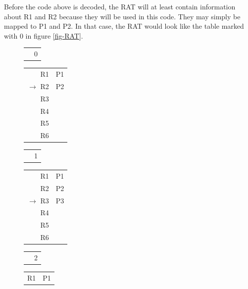 \documentclass[12pt,a4paper]{article} %
\begin{document}
Before the code above is decoded, the RAT will at least contain information about R1 and R2 because they will be used in this code. They may simply be mapped to P1 and P2. In that case, the RAT would look like the table marked with 0 in figure \ref{fig-RAT}.
\begin{figure} [!htb] 
	\hspace{.1\textwidth}%
	\begin{minipage}{.2\textwidth}
		\begin{tabularx} {\textwidth} {R  C}
			& 0\\
		\end{tabularx}	
		\begin{tabularx} {\textwidth} {R | X|}
			R1 					  & P1\\
			$\rightarrow$ R2					  & P2\\
			R3					  & \\
			R4					  & \\
			R5					  & \\
			R6					  & \\
		\end{tabularx}
	\end{minipage}%
	\hspace{.1\textwidth}%
	\begin{minipage}{.2\textwidth}
		\begin{tabularx} {\textwidth} {R  C}
			& 1\\
		\end{tabularx}
	\begin{tabularx} {\textwidth} {R | X|}
		R1 					  & P1\\
		R2					  & P2\\
		$\rightarrow$ 
		R3					  & P3\\
		R4					  & \\
		R5					  & \\
		R6					  & \\
	\end{tabularx}
	\end{minipage}%
	\hspace{.1\textwidth}%
	\begin{minipage}{.2\textwidth}
		\begin{tabularx} {\textwidth} {R  C}
			& 2\\
		\end{tabularx}
	\begin{tabularx} {\textwidth} {R | X|}
		R1 					  & P1\\

\end{tabularx}
\end{minipage}
\end{figure}
\end{document}
